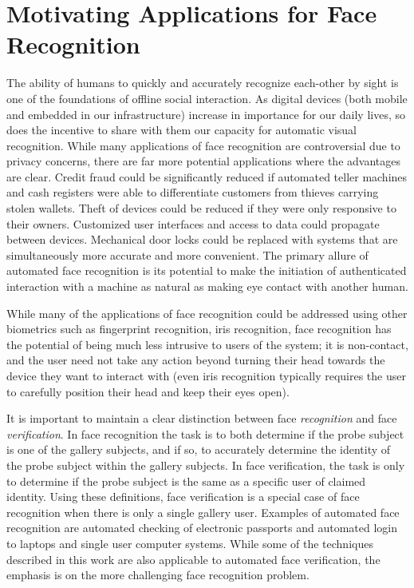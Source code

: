 \section{Motivating Applications for Face Recognition}
The ability of humans to quickly and accurately recognize each-other by sight
is one of the foundations of offline social interaction.  As digital devices
(both mobile and embedded in our infrastructure) increase in importance for our
daily lives, so does the incentive to share with them our capacity for
automatic visual recognition.  While many applications of face recognition are
controversial due to privacy concerns, there are far more potential
applications where the advantages are clear.  Credit fraud could be
significantly reduced if automated teller machines and cash registers were able
to differentiate customers from thieves carrying stolen wallets.  Theft of
devices could be reduced if they were only responsive to their owners.
Customized user interfaces and access to data could propagate between devices.
Mechanical door locks could be replaced with systems that are simultaneously
more accurate and more convenient.  The primary allure of
automated face recognition is its potential to make the initiation of
authenticated interaction with a machine as natural as making eye contact with
another human.

While many of the applications of face recognition could be addressed using
other biometrics such as fingerprint recognition, iris recognition, face
recognition has the potential of being much less intrusive to users of the
system; it is non-contact, and the user need not take any action beyond turning
their head towards the device they want to interact with (even iris recognition
typically requires the user to carefully position their head and keep their
eyes open).  

It is important to maintain a clear distinction between face {\em recognition}
and face {\em verification}.  In face recognition the task is to both determine
if the probe subject is one of the gallery subjects, and if so, to accurately
determine the identity of the probe subject within the gallery subjects.  In
face verification, the task is only to determine if the probe subject is the
same as a specific user of claimed identity.  Using these definitions, face
verification is a special case of face recognition when there is only a single
gallery user.  Examples of automated face recognition are automated checking of electronic
passports and automated login to laptops and single user computer systems.  While some
of the techniques described in this work are also applicable to automated face
verification, the emphasis is on the more challenging face recognition problem.


